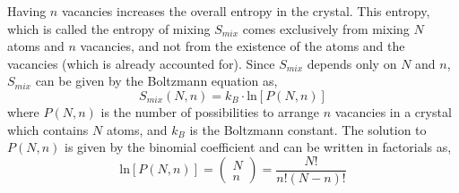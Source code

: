 \documentclass{article}
\begin{document}
Having $n$ vacancies increases the overall entropy in the crystal. This entropy, which is called the entropy of mixing $S_{mix}$ comes exclusively from mixing $N$ atoms and $n$ vacancies, and not from the existence of the atoms and the vacancies (which is already accounted for). Since $S_{mix}$ depends only on $N$ and $n$, $S_{mix}$ can be given by the Boltzmann equation \cite{Gottstein2004} as,
%
\begin{equation} \label{eq:51}
S_{mix}(N, n) = k_B\cdot \mathrm{ln}[P(N, n)]
\end{equation}
% 
where $P(N, n)$ is the number of possibilities to arrange $n$ vacancies in a crystal which contains $N$ atoms, and $k_B$ is the Boltzmann constant. The solution to $P(N, n)$ is given by the binomial coefficient and can be written in factorials as,
%
\begin{equation} \label{eq:52}
\mathrm{ln}[P(N, n)] = \begin{pmatrix}N \\ n \end{pmatrix} = \dfrac{N!}{n!(N-n)!}
\end{equation}
% 
\end{document}
